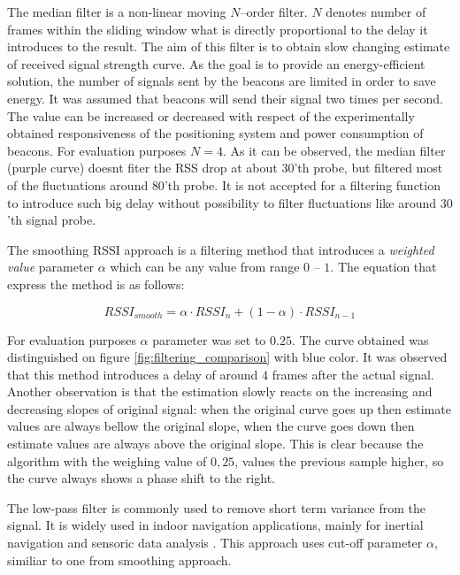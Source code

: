 \documentclass[../main.tex]{subfiles}
\begin{document}
The median filter is a non-linear moving $N$--order filter. $N$ denotes number of frames within the sliding window what is directly proportional to the delay it introduces to the result. The aim of this filter is to obtain slow changing estimate of received signal strength curve. As the goal is to provide an energy-efficient solution, the number of signals sent by the beacons are limited in order to save energy. It was assumed that beacons will send their signal two times per second. The value can be increased or decreased with respect of the experimentally obtained responsiveness of the positioning system and power consumption of beacons. For evaluation purposes $N=4$. As it can be observed, the median filter (purple curve) doesnt fiter the RSS drop at about $30$'th probe, but filtered most of the fluctuations around $80$'th probe. It is not accepted for a filtering function to introduce such big delay without possibility to filter fluctuations like around $30$'th signal probe.

The smoothing RSSI approach \cite{rssi_smoothing} is a filtering method that introduces a \textit{weighted value} parameter $\alpha$ which can be any value from range $0$ -- $1$. The equation that express the method is as follows:

\begin{equation}
\label{eq:rssi_smoothing}
	RSSI_{smooth} = \alpha \cdot RSSI_n + (1 - \alpha) \cdot RSSI_{n-1}
\end{equation}

For evaluation purposes $\alpha$ parameter was set to $0.25$. The curve obtained was distinguished on figure \ref{fig:filtering_comparison} with blue color. It was observed that this method introduces a delay of around $4$ frames after the actual signal. Another observation is that the estimation slowly reacts on the increasing and decreasing slopes of original signal: when the original curve goes up then estimate values are always bellow the original slope, when the curve goes down then estimate values are always above the original slope. This is clear because the algorithm with the weighing value of $0,25$, values the previous sample higher, so the curve always shows a phase shift to the right.

The low-pass filter is commonly used to remove short term variance from the signal. It is widely used in indoor navigation applications, mainly for inertial navigation and sensoric data analysis \cite{indoor_positioning_for_ar}\cite{indoor_navi_for_android2}\cite{report_indoor_navi_for_smartphones}\cite{thesis_ins_algorithms_for_android}\cite{indoor_positioning_for_ar_PhD_GOOD}. This approach uses cut-off parameter $\alpha$, similiar to one from smoothing approach.
\end{document}
